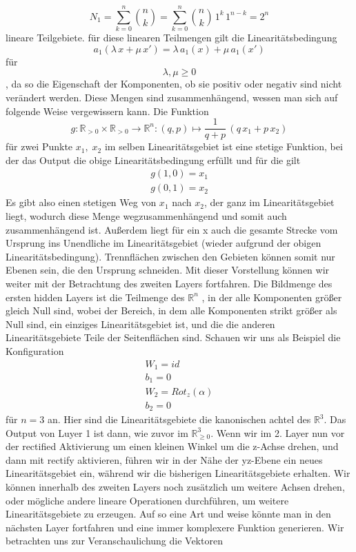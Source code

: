 \documentclass[12pt]{article}
\begin{document}
$$N_1 = \sum_{k=0}^n\binom{n}{k}=\sum_{k=0}^n\binom{n}{k}\,1^k\,1^{n-k}=2^n$$
lineare Teilgebiete. für diese linearen Teilmengen gilt die Linearitätsbedingung
$$a_1\left(\lambda\,x+\mu\,x'\right)=\lambda\,a_1(x)+\mu\,a_1(x')$$
für $$\lambda,\mu\geq0$$, da so die Eigenschaft der Komponenten, ob sie positiv oder negativ sind nicht verändert werden. Diese Mengen sind zusammenhängend, wessen man sich auf folgende Weise vergewissern kann. Die Funktion
$$g:\mathbb{R}_{>0}\times\mathbb{R}_{>0} \rightarrow\mathbb{R}^n:(q,p)\mapsto \frac{1}{q+p}\,\left(q\,x_1+p\,x_2\right)$$
für zwei Punkte $x_1,\;x_2$ im selben Linearitätsgebiet ist eine stetige Funktion, bei der das Output die obige Linearitätsbedingung erfüllt und für die gilt 
\begin{align*}
    g(1,0)=x_1\\
    g(0,1)=x_2
\end{align*}
Es gibt also einen stetigen Weg von $x_1$ nach $x_2$, der ganz im Linearitätsgebiet liegt, wodurch diese Menge wegzusammenhängend und somit auch zusammenhängend ist. Außerdem liegt für ein x auch die gesamte Strecke vom Ursprung ins Unendliche im Linearitätsgebiet (wieder aufgrund der obigen Linearitätsbedingung). Trennflächen zwischen den Gebieten können somit nur Ebenen sein, die den Ursprung schneiden. Mit dieser Vorstellung können wir weiter mit der Betrachtung des zweiten Layers fortfahren. Die Bildmenge des ersten hidden Layers ist die Teilmenge des $\mathbb{R}^n$ , in der alle Komponenten größer gleich Null sind, wobei der Bereich, in dem alle Komponenten strikt größer als Null sind, ein einziges Linearitätsgebiet ist, und die die anderen Linearitätsgebiete Teile der Seitenflächen sind. 
Schauen wir uns als Beispiel die Konfiguration 
\begin{align*}
    W_1=id\\
    b_1=0\\
    W_2=Rot_z(\alpha)\\
    b_2=0
\end{align*}
für $n=3$ an. Hier sind die Linearitätsgebiete die kanonischen achtel des $\mathbb{R}^3$. Das Output von Luyer 1 ist dann, wie zuvor im $\mathbb{R}_{\geq0}^3$. Wenn wir im 2. Layer nun vor der rectified Aktivierung um einen kleinen Winkel um die z-Achse drehen, und dann mit rectify aktivieren, führen wir in der Nähe der yz-Ebene ein neues Linearitätsgebiet ein, während wir die bisherigen Linearitätsgebiete erhalten. Wir können innerhalb des zweiten Layers noch zusätzlich um weitere Achsen drehen, oder mögliche andere lineare Operationen durchführen, um weitere Linearitätsgebiete zu erzeugen. Auf so eine Art und weise könnte man in den nächsten Layer fortfahren und eine immer komplexere Funktion generieren. Wir betrachten uns zur Veranschaulichung die Vektoren
\end{document}
